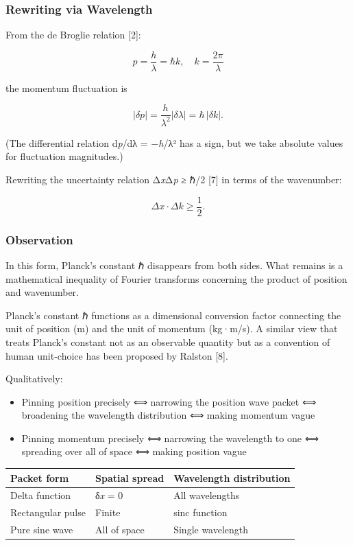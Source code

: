 \documentclass[
  11pt,
]{article}
\newcounter{none} %
\providecommand{\tightlist}{%
  \setlength{\itemsep}{0pt}\setlength{\parskip}{0pt}}
\begin{document}
\subsubsection{Rewriting via Wavelength}\label{rewriting-via-wavelength}

From the de Broglie relation {[}2{]}:

\[p = \frac{h}{\lambda} = \hbar k, \quad k = \frac{2\pi}{\lambda}\]

the momentum fluctuation is

\[|\delta p| = \frac{h}{\lambda^2}|\delta\lambda| = \hbar \, |\delta k|.\]

(The differential relation d\emph{p}/dλ = −\emph{h}/λ² has a sign, but
we take absolute values for fluctuation magnitudes.)

Rewriting the uncertainty relation Δ\emph{x}Δ\emph{p} ≥ ℏ/2 {[}7{]} in
terms of the wavenumber:

\[\Delta x \cdot \Delta k \geq \frac{1}{2}.\]

\subsubsection{Observation}\label{observation}

In this form, Planck's constant ℏ disappears from both sides. What
remains is a mathematical inequality of Fourier transforms concerning
the product of position and wavenumber.

Planck's constant ℏ functions as a dimensional conversion factor
connecting the unit of position (m) and the unit of momentum (kg·m/s). A
similar view that treats Planck's constant not as an observable quantity
but as a convention of human unit-choice has been proposed by Ralston
{[}8{]}.

Qualitatively:

\begin{itemize}
\tightlist
\item
  Pinning position precisely ⟺ narrowing the position wave packet ⟺
  broadening the wavelength distribution ⟺ making momentum vague
\item
  Pinning momentum precisely ⟺ narrowing the wavelength to one ⟺
  spreading over all of space ⟺ making position vague
\end{itemize}

{\def\LTcaptype{none} %
\begin{longtable}[]{@{}lll@{}}
\toprule\noalign{}
Packet form & Spatial spread & Wavelength distribution \\
\midrule\noalign{}
\endhead
\bottomrule\noalign{}
\endlastfoot
Delta function & δ\emph{x} = 0 & All wavelengths \\
Rectangular pulse & Finite & sinc function \\
Pure sine wave & All of space & Single wavelength \\
\end{longtable}
}
\end{document}
